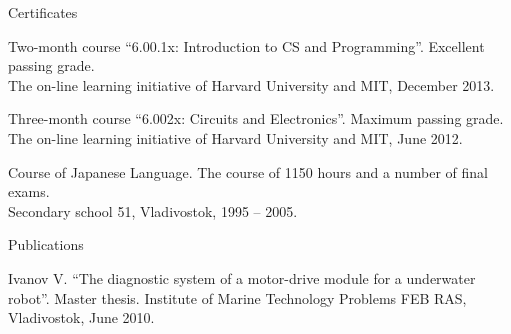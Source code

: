 \documentclass{template}
\begin{document}
\begin{rSection}{Certificates}

\begin{rItemize}
\item Two-month course \textquotedblleft 6.00.1x: Introduction to CS and Programming\textquotedblright. Excellent passing grade. \\
The on-line learning initiative of Harvard University and MIT, December 2013.
\item Three-month course \textquotedblleft 6.002x: Circuits and Electronics\textquotedblright. Maximum passing grade. \\
The on-line learning initiative of Harvard University and MIT, June 2012.
\item Course of Japanese Language. The course of 1150 hours and a number of final exams. \\
Secondary school 51, Vladivostok, 1995 -- 2005.
\end{rItemize}

\end{rSection}


\begin{rSection}{Publications}

\begin{rItemize}
\item Ivanov V. \textquotedblleft The diagnostic system of a motor-drive module for a underwater robot\textquotedblright. Master thesis. Institute of Marine Technology Problems FEB RAS, Vladivostok, June 2010.
\end{rItemize}

\end{rSection}

\end{document}
